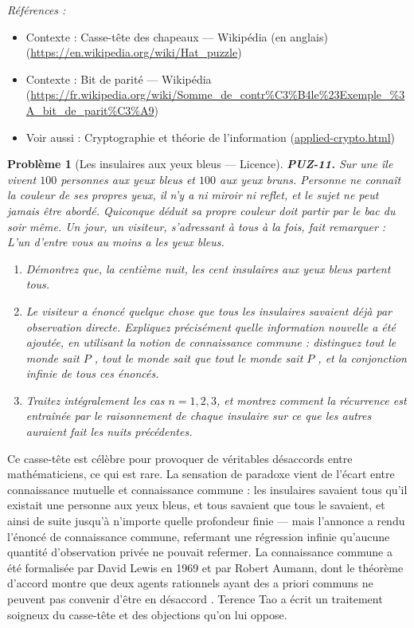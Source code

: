 \documentclass[11pt]{article}
\newtheorem{problem}{Problème}
\newenvironment{refs}{\par\small\noindent\emph{Références :}\begin{itemize}\setlength\itemsep{0pt}}{\end{itemize}\normalsize}
\begin{document}
\begin{refs}
\item Contexte : Casse-tête des chapeaux --- Wikipédia (en anglais) (\url{https://en.wikipedia.org/wiki/Hat_puzzle})
\item Contexte : Bit de parité --- Wikipédia (\url{https://fr.wikipedia.org/wiki/Somme_de_contr%C3%B4le%23Exemple_%3A_bit_de_parit%C3%A9})
\item Voir aussi : Cryptographie et théorie de l'information (\url{applied-crypto.html})
\end{refs}

\bigskip

\begin{problem}[{Les insulaires aux yeux bleus --- Licence}]
\textbf{PUZ-11.} Sur une île vivent $ 100 $ personnes aux yeux bleus et $ 100 $ aux
yeux bruns. Personne ne connaît la couleur de ses propres yeux, il n'y a ni miroir ni
reflet, et le sujet ne peut jamais être abordé. Quiconque déduit sa propre couleur doit
partir par le bac du soir même. Un jour, un visiteur, s'adressant à tous à la fois, fait
remarquer : \og{} L'un d'entre vous au moins a les yeux bleus. \fg{}
\begin{enumerate}
\item[(a)] Démontrez que, la centième nuit, les cent insulaires aux yeux bleus partent tous.
\item[(b)] Le visiteur a énoncé quelque chose que tous les insulaires savaient déjà par
observation directe. Expliquez précisément quelle information nouvelle a été ajoutée, en
utilisant la notion de \textit{connaissance commune} : distinguez \og{} tout le monde sait
$ P $ \fg{}, \og{} tout le monde sait que tout le monde sait $ P $ \fg{}, et la conjonction infinie
de tous ces énoncés.
\item[(c)] Traitez intégralement les cas $ n = 1, 2, 3 $, et montrez comment la récurrence est
entraînée par le raisonnement de chaque insulaire sur ce que les autres auraient fait les
nuits précédentes.
\end{enumerate}

\end{problem}

\noindent Ce casse-tête est célèbre pour provoquer de véritables désaccords entre
mathématiciens, ce qui est rare. La sensation de paradoxe vient de l'écart entre
connaissance mutuelle et connaissance commune : les insulaires savaient tous qu'il existait
une personne aux yeux bleus, et tous savaient que tous le savaient, et ainsi de suite
jusqu'à n'importe quelle profondeur finie --- mais l'annonce a rendu l'énoncé de connaissance
commune, refermant une régression infinie qu'aucune quantité d'observation privée ne pouvait
refermer. La connaissance commune a été formalisée par David Lewis en 1969 et par Robert
Aumann, dont le théorème d'accord montre que deux agents rationnels ayant des a priori
communs ne peuvent pas \og{} convenir d'être en désaccord \fg{}. Terence Tao a écrit un traitement
soigneux du casse-tête et des objections qu'on lui oppose.
\end{document}
